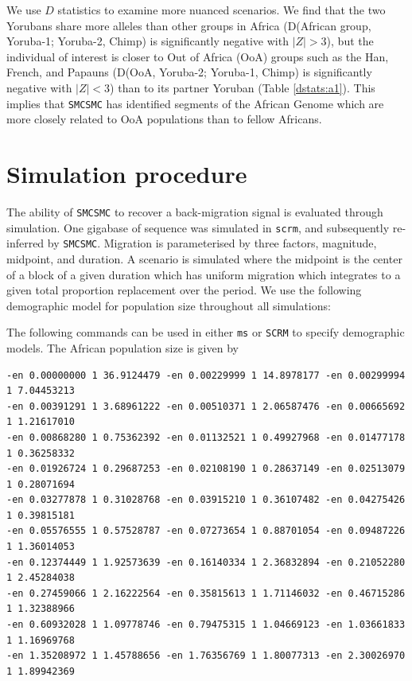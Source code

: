 \documentclass{article}
\begin{document}
We use $D$ statistics to examine more nuanced scenarios. We find that the two Yorubans share more alleles than other groups in Africa (D(African group, Yoruba-1; Yoruba-2, Chimp) is significantly negative with $|Z|>3$), but the individual of interest is closer to Out of Africa (OoA) groups such as the Han, French, and Papauns (D(OoA, Yoruba-2; Yoruba-1, Chimp) is significantly negative with $|Z|<3$) than to its partner Yoruban (Table \ref{dstats:a1}). This implies that {\tt SMCSMC} has identified segments of the African Genome which are more closely related to OoA populations than to fellow Africans.   


\section{Simulation procedure} \label{simproc}

The ability of {\tt SMCSMC} to recover a back-migration signal is evaluated through simulation. One gigabase of sequence was simulated in {\tt scrm}, and subsequently re-inferred by {\tt SMCSMC}. Migration is parameterised by three factors, magnitude, midpoint, and duration. A scenario is simulated where the midpoint is the center of a block of a given duration which has uniform migration which integrates to a given total proportion replacement over the period. We use the following demographic model for population size throughout all simulations:


The following commands can be used in either {\tt ms} or {\tt SCRM} to specify demographic models. The African population size is given by 

\begin{verbatim}
-en 0.00000000 1 36.9124479 -en 0.00229999 1 14.8978177 -en 0.00299994 1 7.04453213 
-en 0.00391291 1 3.68961222 -en 0.00510371 1 2.06587476 -en 0.00665692 1 1.21617010
-en 0.00868280 1 0.75362392 -en 0.01132521 1 0.49927968 -en 0.01477178 1 0.36258332
-en 0.01926724 1 0.29687253 -en 0.02108190 1 0.28637149 -en 0.02513079 1 0.28071694
-en 0.03277878 1 0.31028768 -en 0.03915210 1 0.36107482 -en 0.04275426 1 0.39815181
-en 0.05576555 1 0.57528787 -en 0.07273654 1 0.88701054 -en 0.09487226 1 1.36014053
-en 0.12374449 1 1.92573639 -en 0.16140334 1 2.36832894 -en 0.21052280 1 2.45284038
-en 0.27459066 1 2.16222564 -en 0.35815613 1 1.71146032 -en 0.46715286 1 1.32388966
-en 0.60932028 1 1.09778746 -en 0.79475315 1 1.04669123 -en 1.03661833 1 1.16969768
-en 1.35208972 1 1.45788656 -en 1.76356769 1 1.80077313 -en 2.30026970 1 1.89942369
\end{verbatim}
\end{document}
